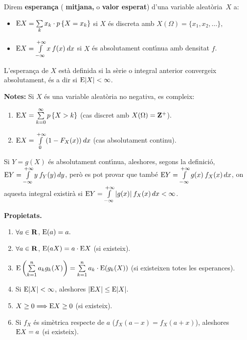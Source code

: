 \begin{defin}
Direm {\bf esperan\c ca} ({\bf
mitjana,} o {\bf valor esperat}) 
d'una va\-ria\-ble ale\-at\`o\-ria~$X$ a:

\begin{itemize}

\item ${\rm E} X = \sum\limits_k x_k \cdot p\left\{X = x_k\right\}$ si $X$ \'es discreta amb
$X(\Omega) = \{ x_1, x_2, \ldots \},$

\item ${\rm E} X = \int\limits_{-\infty}^{+\infty} x \> f(x) \> dx$ si $X$ \'es
absolutament cont\'{\i}nua amb densitat $f$.
\end{itemize}
\end{defin}

L'esperan\c ca de $X$ est\`a definida si la s\`erie o integral anterior
convergeix
absolutament, \'es a dir si ${\rm E} |X| < \infty$.

{\bf Notes:} Si $X$ \'es una variable aleat\`oria no negativa, es compleix:

\begin{enumerate}

\item ${\rm E} X = \sum\limits_{k=0}^\infty p\left\{X > k\right\}$ (cas discret amb
$X(\Omega) = {\bf Z}^+$).

\item ${\rm E} X = \int\limits_{0}^{+\infty} (1 - F_X(x)) \> dx$ (cas
absolutament continu).

\end{enumerate}

Si $Y = g(X)$ \'es absolutament cont\'{\i}nua, aleshores, segons la definici\'o,
${\rm E} Y = \int\limits_{-\infty}^{+\infty} y \> f_Y (y) \, dy$, per\`o es 
pot provar que tamb\'e ${\rm E} Y = \int\limits_{-\infty}^{+\infty} g(x)
\> f_X(x) \, dx$, on aquesta integral existir\`a si ${\rm E} Y =
\int\limits_{-\infty}^{+\infty} |g(x)| \> f_X(x) \, dx < \infty$.

{\bf Propietats.}

\begin{enumerate}

\item $\forall a \in {\bf R}$, ${\rm E} (a) = a.$

\item $\forall a \in {\bf R}$, ${\rm E} (aX) = a \cdot {\rm E} X$ (si existeix).

\item ${\rm E} \left(\sum\limits_{k=1}^n a_k g_k(X) \right) = 
\sum\limits_{k=1}^n a_k \cdot {\rm E} (g_k(X))$ (si existeixen totes les esperances).

\item Si ${\rm E} |X| < \infty$, aleshores $|{\rm E} X| \leq {\rm E} |X|.$

\item $X \geq 0 \Longrightarrow {\rm E} X \geq 0$ (si existeix).

\item Si $f_X$ \'es sim\`etrica respecte de $a$ ($f_X(a-x) = f_X(a+x)$),
aleshores
${\rm E} X = a$ (si existeix).

\end{enumerate}

